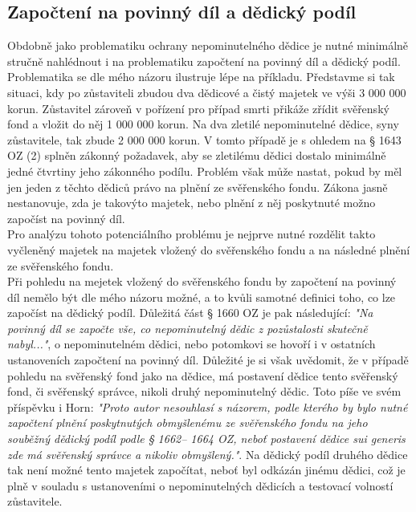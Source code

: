 \documentclass{article}
\begin{document}


\subsection{Započtení na povinný díl a dědický podíl}

Obdobně jako problematiku ochrany nepominutelného dědice je nutné minimálně stručně nahlédnout i na problematiku započtení na povinný díl a dědický podíl.\\

Problematika se dle mého názoru ilustruje lépe na příkladu. Představme si tak situaci, kdy po zůstaviteli zbudou dva dědicové a čistý majetek ve výši 3 000 000 korun. Zůstavitel zároveň v pořízení pro případ smrti přikáže zřídit svěřenský fond a vložit do něj 1 000 000 korun. Na dva zletilé nepominutelné dědice, syny zůstavitele, tak zbude 2 000 000 korun. V tomto případě je s ohledem na § 1643 OZ (2) splněn zákonný požadavek, aby se zletilému dědici dostalo minimálně jedné čtvrtiny jeho zákonného podílu. Problém však může nastat, pokud by měl jen jeden z těchto dědiců právo na plnění ze svěřenského fondu. Zákona jasně nestanovuje, zda je takovýto majetek, nebo plnění z něj poskytnuté možno započíst na povinný díl.\\

Pro analýzu tohoto potenciálního problému je nejprve nutné rozdělit takto vyčleněný majetek na majetek vložený do svěřenského fondu a na následné plnění ze svěřenského fondu.\\

Při pohledu na mejetek vložený do svěřenského fondu by započtení na povinný díl nemělo být dle mého názoru možné, a to kvůli samotné definici toho, co lze započíst na dědický podíl. Důležitá část § 1660 OZ je pak následující: \textit{"Na povinný díl se započte vše, co nepominutelný dědic z pozůstalosti skutečně nabyl..."}, o nepominutelném dědici, nebo potomkovi se hovoří i v ostatních ustanoveních započtení na povinný díl. Důležité je si však uvědomit, že v případě pohledu na svěřenský fond jako na dědice, má postavení dědice tento svěřenský fond, či svěřenský správce, nikoli druhý nepominutelný dědic. Toto píše ve svém příspěvku i Horn: \textit{"Proto autor nesouhlasí s názorem, podle kterého by bylo nutné započtení plnění poskytnutých obmyšlenému ze svěřenského fondu na jeho souběžný dědický podíl podle § 1662– 1664 OZ, neboť postavení dědice sui generis zde má svěřenský správce a nikoliv obmyšlený."}. Na dědický podíl druhého dědice tak není možné tento majetek započítat, neboť byl odkázán jinému dědici, což je plně v souladu s ustanoveními o nepominutelných dědicích a testovací volností zůstavitele.\\
\end{document}
